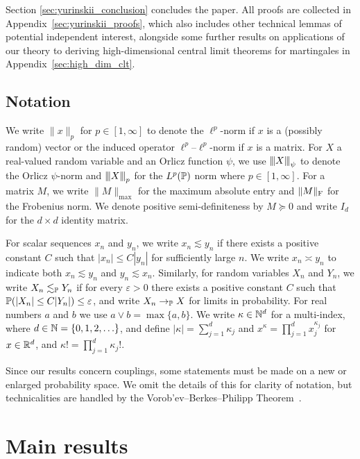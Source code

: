 Section \ref{sec:yurinskii_conclusion} concludes the paper.
All proofs are collected in Appendix~\ref{sec:yurinskii_proofs},
which also includes other technical lemmas of
potential independent interest, alongside
some further results on applications of our theory to
deriving high-dimensional central limit theorems for martingales
in Appendix~\ref{sec:high_dim_clt}.

\subsection{Notation}

We write $\|x\|_p$ for $p\in[1,\infty]$ to denote the $\ell^p$-norm if $x$ is a
(possibly random) vector or the induced operator $\ell^p$--$\ell^p$-norm if $x$
is a matrix. For $X$ a real-valued random variable and an Orlicz function
$\psi$, we use $\vvvert X \vvvert_\psi$ to denote the Orlicz $\psi$-norm
\citep[Section~2.2]{van1996weak} and $\vvvert X \vvvert_p$ for the $L^p(\P)$
norm where $p\in [1,\infty]$. For a matrix $M$, we write $\|M\|_{\max}$ for the
maximum absolute entry and $\|M\|_\rF$ for the Frobenius norm. We denote
positive semi-definiteness by $M \succeq 0$ and write $I_d$ for the $d \times
d$ identity matrix.

For scalar sequences $x_n$ and $y_n$, we write $x_n \lesssim y_n$ if there
exists a positive constant $C$ such that $|x_n| \leq C |y_n|$ for sufficiently
large $n$. We write $x_n \asymp y_n$ to indicate both $x_n \lesssim y_n$ and
$y_n \lesssim x_n$. Similarly, for random variables $X_n$ and $Y_n$, we write
$X_n \lesssim_\P Y_n$ if for every $\varepsilon > 0$ there exists a positive
constant $C$ such that $\P(|X_n| \leq C |Y_n|) \leq \varepsilon$, and write
$X_n \to_\P X$ for limits in probability. For real numbers $a$ and $b$ we use
$a \vee b = \max\{a,b\}$. We write $\kappa \in \N^d$ for a multi-index, where
$d \in \N = \{0, 1, 2, \ldots\}$, and define $|\kappa| = \sum_{j=1}^d \kappa_j$
and $x^\kappa = \prod_{j=1}^d x_j^{\kappa_j}$ for $x \in \R^d$,
and $\kappa! = \prod_{j=1}^{d} \kappa_j !$.

Since our results concern couplings, some statements must be made on a new or
enlarged probability space. We omit the details of this for clarity of
notation, but technicalities are handled by the Vorob'ev--Berkes--Philipp
Theorem~\citep[Theorem~1.1.10]{dudley1999uniform}.

\section{Main results}
\label{sec:main_results}

